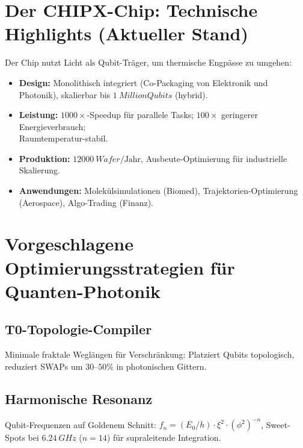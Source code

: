 	\section{Der CHIPX-Chip: Technische Highlights (Aktueller Stand)}
	
	Der Chip nutzt Licht als Qubit-Träger, um thermische Engpässe zu umgehen:
	\begin{itemize}
		\item \textbf{Design:} Monolithisch integriert (Co-Packaging von Elektronik und Photonik), skalierbar bis $\SI{1}{Million}{Qubits}$ (hybrid).
		\item \textbf{Leistung:} $1000\times$-Speedup für parallele Tasks; $100\times$ geringerer Energieverbrauch;\\ Raumtemperatur-stabil.
		\item \textbf{Produktion:} $\SI{12000}{Wafer}/\text{Jahr}$, Ausbeute-Optimierung für industrielle Skalierung.
		\item \textbf{Anwendungen:} Molekülsimulationen (Biomed), Trajektorien-Optimierung (Aerospace), Algo-Trading (Finanz).
	\end{itemize}
	
	\section{Vorgeschlagene Optimierungsstrategien für Quanten-Photonik}
	
	\subsection{T0-Topologie-Compiler}
	Minimale fraktale Weglängen für Verschränkung: Platziert Qubits topologisch, reduziert SWAPs um $30$--$50\%$ in photonischen Gittern.
	\subsection{Harmonische Resonanz}
	Qubit-Frequenzen auf Goldenem Schnitt: $f_n = (E_0 / h) \cdot \xi^2 \cdot (\phi^2)^{-n}$, Sweet-Spots bei $\SI{6.24}{GHz}$ ($n=14$) für supraleitende Integration.
